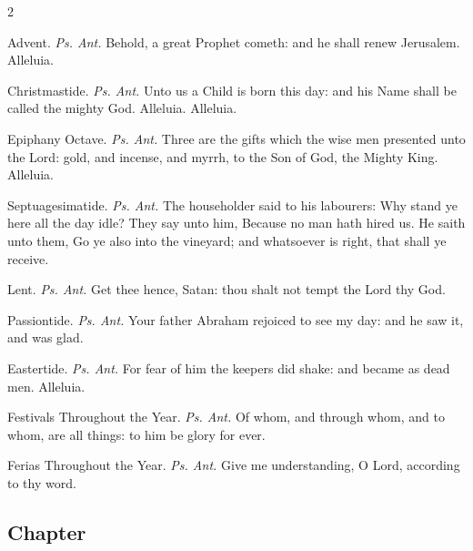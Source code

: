 \begin{multicols}{2}
\par\noindent
{\color{RubricRed}Advent.} \textit{Ps. Ant.} Behold, a great Prophet cometh: and he shall renew Jerusalem. Alleluia.
\par\noindent
{\color{RubricRed}Christmastide.} \textit{Ps. Ant.} Unto us a Child is born this day: and his Name shall be called the mighty God. Alleluia. Alleluia.
\par\noindent
{\color{RubricRed}Epiphany Octave.} \textit{Ps. Ant.} Three are the gifts which the wise men presented unto the Lord: gold, and incense, and myrrh, to the Son of God, the Mighty King. Alleluia.
\par\noindent
{\color{RubricRed}Septuagesimatide.} \textit{Ps. Ant.} The householder said to his labourers: Why stand ye here all the day idle? They say unto him, Because no man hath hired us. He saith unto them, Go ye also into the vineyard; and whatsoever is right, that shall ye receive.
\par\noindent
{\color{RubricRed}Lent.} \textit{Ps. Ant.} Get thee hence, Satan: thou shalt not tempt the Lord thy God.
\par\noindent
{\color{RubricRed}Passiontide.} \textit{Ps. Ant.} Your father Abraham rejoiced to see my day: and he saw it, and was glad.
\par\noindent
{\color{RubricRed}Eastertide.} \textit{Ps. Ant.} For fear of him the keepers did shake: and became as dead men. Alleluia.
\par\noindent
{\color{RubricRed}Festivals Throughout the Year.} \textit{Ps. Ant.} Of whom, and through whom, and to whom, are all things: to him be glory for ever.
\par\noindent
{\color{RubricRed}Ferias Throughout the Year.} \textit{Ps. Ant.} Give me understanding, O Lord, according to thy word.


\subsection{Chapter}



\end{multicols}
